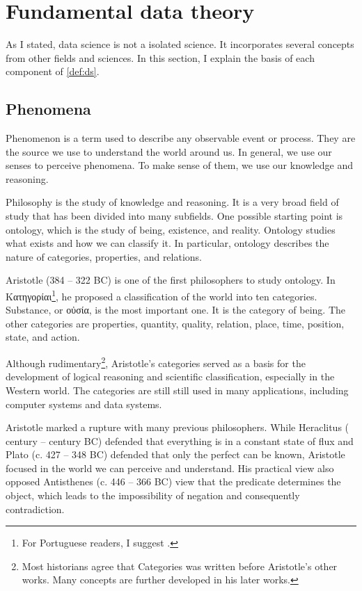 \section{Fundamental data theory}

As I stated, data science is not a isolated science.  It incorporates several concepts
from other fields and sciences.  In this section, I explain the basis of each component of
\cref{def:ds}.

\subsection{Phenomena}

Phenomenon is a term used to describe any observable event or process.  They are the
source we use to understand the world around us.  In general, we use our senses to
perceive phenomena.  To make sense of them, we use our knowledge and reasoning.

Philosophy is the study of knowledge and reasoning.  It is a very broad field of study
that has been divided into many subfields.  One possible starting point is \gls{ontology},
which is the study of being, existence, and reality.  Ontology studies what exists and how
we can classify it.  In particular, ontology describes the nature of categories,
properties, and relations.

Aristotle (384 -- 322 BC) is one of the first philosophers to study ontology. In
Κατηγορίαι\footnote{For Portuguese readers, I suggest .}, he
proposed a classification of the world into ten categories. Substance, or οὐσία,
is the most important one.  It is the category of being.  The other categories
are properties, quantity, quality, relation, place, time, position, state, and action.

Although rudimentary\footnote{Most historians agree that Categories was written before
Aristotle's other works.  Many concepts are further developed in his later works.},
Aristotle's categories served as a basis for the development of logical reasoning and
scientific classification, especially in the Western world.  The categories are still
still used in many applications, including computer systems and data systems.

Aristotle marked a rupture with many previous philosophers.  While Heraclitus (
century --  century BC) defended that everything is in a constant state of flux and
Plato (c. 427 -- 348 BC) defended that only the perfect can be known, Aristotle focused in
the world we can perceive and understand.  His practical view also opposed Antisthenes (c.
446 -- 366 BC) view that the predicate determines the object, which leads to the
impossibility of negation and consequently contradiction.

